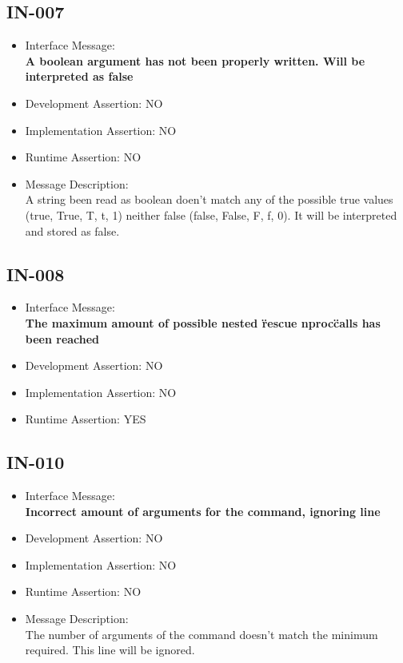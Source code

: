 \subsection{IN-007}
\begin{itemize}
  \item Interface Message:\\[1em]\textbf{A boolean argument has not been properly written. Will be interpreted as false}
  \item Development Assertion: NO
  \item Implementation Assertion: NO
  \item Runtime Assertion: NO
  \item Message Description:\\[1em]A string been read as boolean doen't match any of the possible true values (true, True, T, t, 1) neither false (false, False, F, f, 0). It will be interpreted and stored as false.
\end{itemize}

\subsection{IN-008}
\begin{itemize}
  \item Interface Message:\\[1em]\textbf{The maximum amount of possible nested \"rescue nproc\" calls has been reached}
  \item Development Assertion: NO
  \item Implementation Assertion: NO
  \item Runtime Assertion: YES
\end{itemize}

\subsection{IN-010}
\begin{itemize}
  \item Interface Message:\\[1em]\textbf{Incorrect amount of arguments for the command, ignoring line}
  \item Development Assertion: NO
  \item Implementation Assertion: NO
  \item Runtime Assertion: NO
  \item Message Description:\\[1em]The number of arguments of the command doesn't match the minimum required. This line will be ignored.
\end{itemize}

